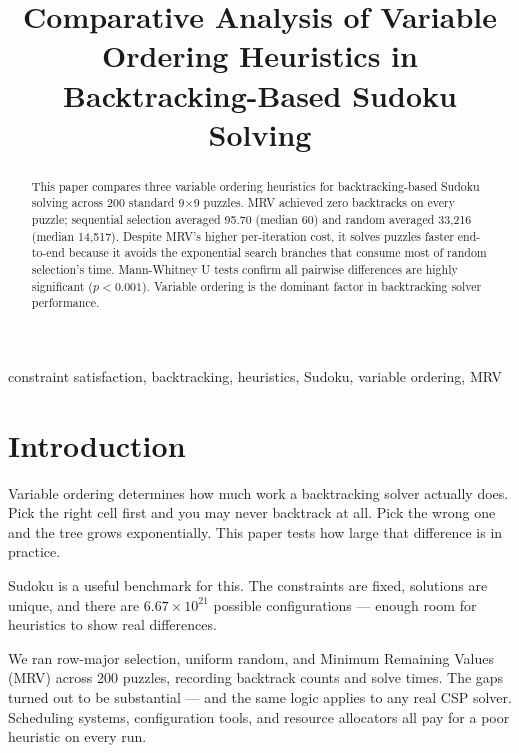 \documentclass[conference]{IEEEtran}
\begin{document}
\title{Comparative Analysis of Variable Ordering Heuristics in Backtracking-Based Sudoku Solving}

\author{
}

\maketitle

\begin{abstract}
This paper compares three variable ordering heuristics for backtracking-based Sudoku solving across 200 standard 9×9 puzzles. MRV achieved zero backtracks on every puzzle; sequential selection averaged 95.70 (median 60) and random averaged 33,216 (median 14,517). Despite MRV's higher per-iteration cost, it solves puzzles faster end-to-end because it avoids the exponential search branches that consume most of random selection's time. Mann-Whitney U tests confirm all pairwise differences are highly significant ($p < 0.001$). Variable ordering is the dominant factor in backtracking solver performance.
\end{abstract}

\begin{IEEEkeywords}
constraint satisfaction, backtracking, heuristics, Sudoku, variable ordering, MRV
\end{IEEEkeywords}

\section{Introduction}
Variable ordering determines how much work a backtracking solver actually does. Pick the right cell first and you may never backtrack at all. Pick the wrong one and the tree grows exponentially. This paper tests how large that difference is in practice.

Sudoku is a useful benchmark for this. The constraints are fixed, solutions are unique, and there are $6.67 \times 10^{21}$ possible configurations --- enough room for heuristics to show real differences.

We ran row-major selection, uniform random, and Minimum Remaining Values (MRV) across 200 puzzles, recording backtrack counts and solve times. The gaps turned out to be substantial --- and the same logic applies to any real CSP solver. Scheduling systems, configuration tools, and resource allocators all pay for a poor heuristic on every run.
\end{document}

